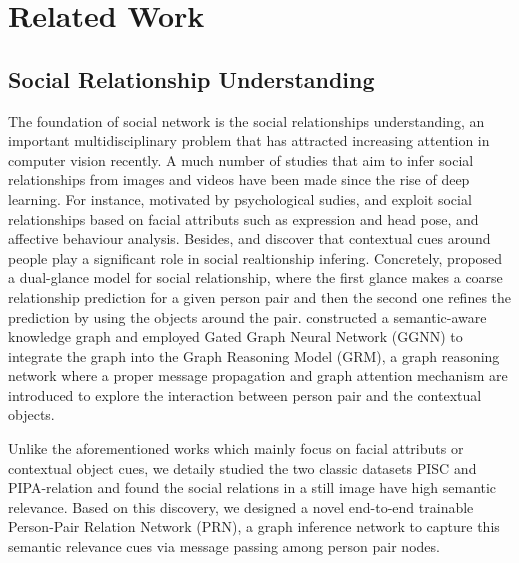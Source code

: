 \documentclass{article}
\begin{document}
\section{Related Work}

\subsection{Social Relationship Understanding}

The foundation of social network is the social relationships understanding, an important multidisciplinary problem that has attracted increasing attention in computer vision recently. A much number of studies that aim to infer social relationships from images \cite{DBLP:conf/ijcai/WangWG15,DBLP:conf/iccv/LiWZK17,DBLP:conf/ijcai/WangCRYCL18,DBLP:conf/eccv/WangGLF10,DBLP:conf/iccv/ZhangLLT15} and videos \cite{DBLP:conf/eccv/DingY10,DBLP:conf/cvpr/RamanathanY013,DBLP:journals/ivc/VinciarelliPB09} have been made since the rise of deep learning. For instance, motivated by psychological sudies, \cite{DBLP:conf/iccv/ZhangLLT15} and \cite{DBLP:conf/iccv/DibekliogluSG13} exploit social relationships based on facial attributs such as expression and head pose, and affective behaviour analysis. Besides, \cite{DBLP:conf/iccv/LiWZK17} and \cite{DBLP:conf/ijcai/WangCRYCL18} discover that contextual cues around people play a significant role in social realtionship infering. Concretely, \cite{DBLP:conf/iccv/LiWZK17} proposed a dual-glance model for social relationship, where the first glance makes a coarse relationship prediction for a given person pair and then the second one refines the prediction by using the objects around the pair. \cite{DBLP:conf/ijcai/WangCRYCL18} constructed a semantic-aware knowledge graph and employed Gated Graph Neural Network (GGNN) \cite{DBLP:journals/tomccap/LiSKJZW15} to integrate the graph into the Graph Reasoning Model (GRM), a graph reasoning network where a proper message propagation and graph attention mechanism are introduced to explore the interaction between person pair and the contextual objects.

Unlike the aforementioned works which mainly focus on facial attributs or contextual object cues, we detaily studied the two classic datasets PISC \cite{DBLP:conf/iccv/LiWZK17} and PIPA-relation \cite{DBLP:conf/cvpr/SunSF17} and found the social relations in a still image have high semantic relevance. Based on this discovery, we designed a novel end-to-end trainable Person-Pair Relation Network (PRN), a graph inference network to capture this semantic relevance cues via message passing among person pair nodes.
\end{document}
